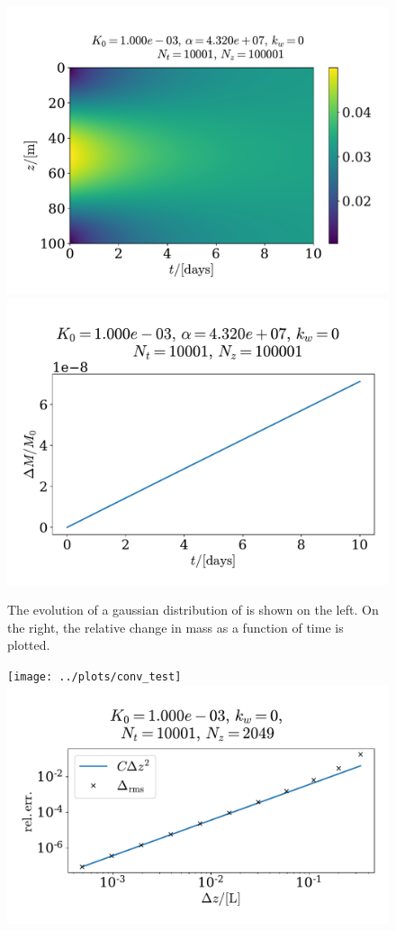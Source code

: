 \documentclass{article}
\begin{document}
    \begin{figure}
        \centering
        \includegraphics[width=.49\textwidth]{../plots/test2_c}
        \includegraphics[width=.49\textwidth]{../plots/test2_m}
        \label{Consv mass}
        \caption{The evolution of a gaussian distribution of  is shown on the left. On the right, the relative change in mass as a function of time is plotted. }
    \end{figure}


    \begin{figure}
        \centering
        \texttt{[image: ../plots/conv\_test]}
        \includegraphics[width=.49\textwidth]{../plots/conv_test_z}
        \label{convergence test}
        \caption{}
    \end{figure}
    
    
\end{document}
